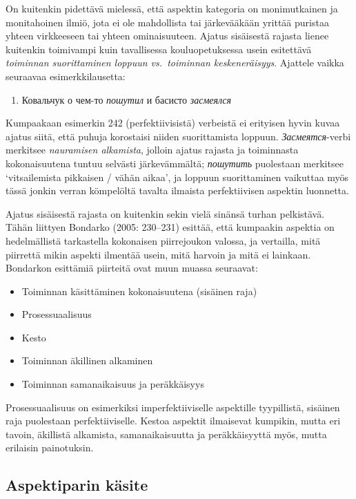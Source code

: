 \documentclass[]{scrartcl}
\providecommand{\tightlist}{%
  \setlength{\itemsep}{0pt}\setlength{\parskip}{0pt}}
\begin{document}
On kuitenkin pidettävä mielessä, että aspektin kategoria on
monimutkainen ja monitahoinen ilmiö, jota ei ole mahdollista tai
järkevääkään yrittää puristaa yhteen virkkeeseen tai yhteen
ominaisuuteen. Ajatus sisäisestä rajasta lienee kuitenkin toimivampi
kuin tavallisessa kouluopetuksessa usein esitettävä \emph{toiminnan
suorittaminen loppuun vs.~toiminnan keskeneräisyys}. Ajattele vaikka
seuraavaa esimerkkilausetta:

\begin{enumerate}
\def\labelenumi{(\arabic{enumi})}
\setcounter{enumi}{241}
\tightlist
\item
  Ковальчук о чем-то \emph{пошутил} и басисто \emph{засмеялся}
\end{enumerate}

Kumpaakaan esimerkin 242 (perfektiivisistä) verbeistä ei erityisen hyvin
kuvaa ajatus siitä, että puhuja korostaisi niiden suorittamista loppuun.
\emph{Засмеятся}-verbi merkitsee \emph{nauramisen alkamista}, jolloin
ajatus rajasta ja toiminnasta kokonaisuutena tuntuu selvästi
järkevämmältä; \emph{пошутить} puolestaan merkitsee `vitsailemista
pikkaisen / vähän aikaa', ja loppuun suorittaminen vaikuttaa myös tässä
jonkin verran kömpelöltä tavalta ilmaista perfektiivisen aspektin
luonnetta.

Ajatus sisäisestä rajasta on kuitenkin sekin vielä sinänsä turhan
pelkistävä. Tähän liittyen Bondarko (2005: 230--231) esittää, että
kumpaakin aspektia on hedelmällistä tarkastella kokonaisen piirrejoukon
valossa, ja vertailla, mitä piirrettä mikin aspekti ilmentää usein, mitä
harvoin ja mitä ei lainkaan. Bondarkon esittämiä piirteitä ovat muun
muassa seuraavat:

\begin{itemize}
\tightlist
\item
  Toiminnan käsittäminen kokonaisuutena (sisäinen raja)
\item
  Prosessuaalisuus
\item
  Kesto
\item
  Toiminnan äkillinen alkaminen
\item
  Toiminnan samanaikaisuus ja peräkkäisyys
\end{itemize}

Prosessuaalisuus on esimerkiksi imperfektiiviselle aspektille
tyypillistä, sisäinen raja puolestaan perfektiiviselle. Kestoa aspektit
ilmaisevat kumpikin, mutta eri tavoin, äkillistä alkamista,
samanaikaisuutta ja peräkkäisyyttä myös, mutta erilaisin painotuksin.

\subsection{Aspektiparin käsite}\label{aspektiparin-kuxe4site}
\end{document}
